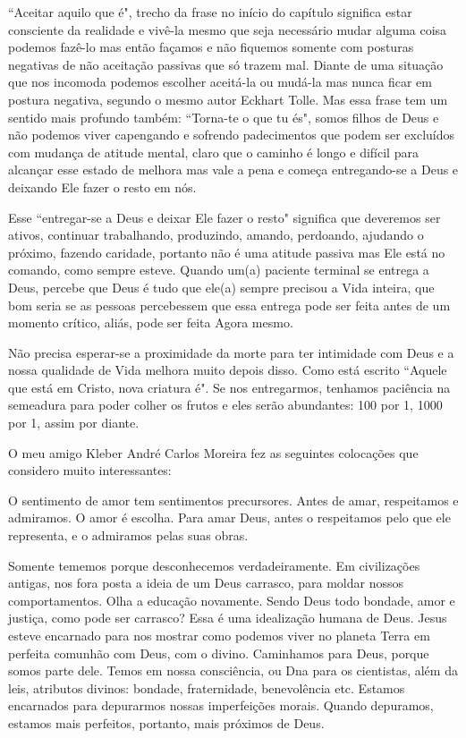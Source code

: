 \emdash{}``Aceitar aquilo que é", trecho da frase no início do capítulo significa estar consciente da realidade e vivê-la mesmo que seja necessário mudar alguma coisa podemos fazê-lo mas então façamos e não fiquemos somente com posturas negativas de não aceitação passivas que só trazem mal. Diante de uma situação que nos incomoda podemos escolher aceitá-la ou mudá-la mas nunca ficar em postura negativa, segundo o mesmo autor Eckhart Tolle. Mas essa frase tem um sentido mais profundo também: ``Torna-te o que tu és", somos filhos de Deus e não podemos viver capengando e sofrendo padecimentos que podem ser excluídos com mudança de atitude mental, claro que o caminho é longo e difícil para alcançar esse estado de melhora mas vale a pena e começa entregando-se a Deus e deixando Ele fazer o resto em nós.

\emdash{}Esse ``entregar-se a Deus e deixar Ele fazer o resto" significa que deveremos ser ativos, continuar trabalhando, produzindo, amando, perdoando, ajudando o próximo, fazendo caridade, portanto não é uma atitude passiva mas Ele está no comando, como sempre esteve. Quando um(a) paciente terminal se entrega a Deus, percebe que Deus é tudo que ele(a) sempre precisou a Vida inteira, que bom seria se as pessoas percebessem que essa entrega pode ser feita antes de um momento crítico, aliás, pode ser feita Agora mesmo.

\emdash{}Não precisa esperar-se a proximidade da morte para ter intimidade com Deus e a nossa qualidade de Vida melhora muito depois disso.  Como está escrito ``Aquele que está em Cristo, nova criatura é". Se nos entregarmos, tenhamos paciência na semeadura para poder colher os frutos e eles serão abundantes: 100 por 1, 1000 por 1, assim por diante.

\emdash{}O meu amigo Kleber André Carlos Moreira fez as seguintes colocações que considero muito interessantes:

\emdash{}O sentimento de amor tem sentimentos precursores. Antes de amar, respeitamos e admiramos. O amor é escolha. Para amar Deus, antes o respeitamos pelo que ele representa, e o admiramos pelas suas obras. 

\emdash{}Somente tememos porque desconhecemos verdadeiramente. Em civilizações antigas, nos fora posta a ideia de um Deus carrasco, para moldar nossos comportamentos. Olha a educação novamente. Sendo Deus todo bondade, amor e justiça, como pode ser carrasco? Essa é uma idealização humana de Deus. 
\emdash{}Jesus esteve encarnado para nos mostrar como podemos viver no planeta Terra em perfeita comunhão com Deus, com o divino. Caminhamos para Deus, porque somos parte dele. Temos em nossa consciência, ou Dna para os cientistas, além da leis, atributos divinos: bondade, fraternidade, benevolência etc. Estamos encarnados para depurarmos nossas imperfeições morais. Quando depuramos, estamos mais perfeitos, portanto, mais próximos de Deus.

